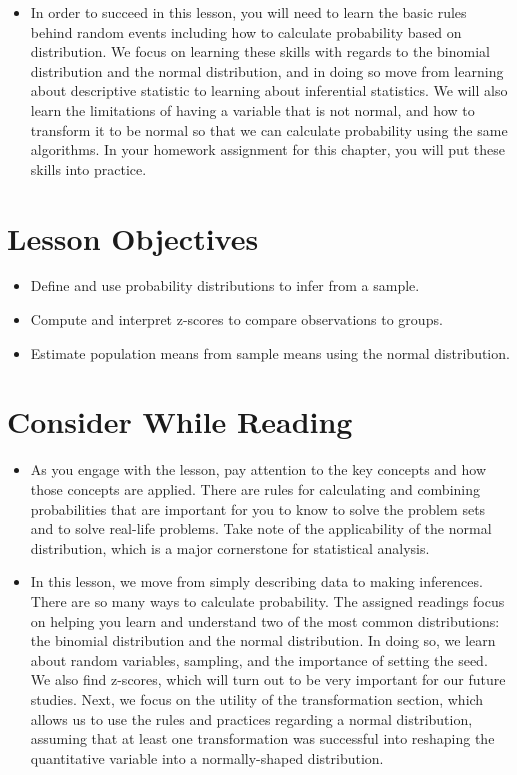 \documentclass[
  letterpaper,
  DIV=11,
  numbers=noendperiod]{scrreprt}
\providecommand{\tightlist}{%
  \setlength{\itemsep}{0pt}\setlength{\parskip}{0pt}}\usepackage{longtable,booktabs,array}
\begin{document}
\begin{itemize}
\tightlist
\item
  In order to succeed in this lesson, you will need to learn the basic
  rules behind random events including how to calculate probability
  based on distribution. We focus on learning these skills with regards
  to the binomial distribution and the normal distribution, and in doing
  so move from learning about descriptive statistic to learning about
  inferential statistics. We will also learn the limitations of having a
  variable that is not normal, and how to transform it to be normal so
  that we can calculate probability using the same algorithms. In your
  homework assignment for this chapter, you will put these skills into
  practice.
\end{itemize}

\section{Lesson Objectives}\label{lesson-objectives-4}

\begin{itemize}
\tightlist
\item
  Define and use probability distributions to infer from a sample.
\item
  Compute and interpret z-scores to compare observations to groups.
\item
  Estimate population means from sample means using the normal
  distribution.
\end{itemize}

\section{Consider While Reading}\label{consider-while-reading-4}

\begin{itemize}
\tightlist
\item
  As you engage with the lesson, pay attention to the key concepts and
  how those concepts are applied. There are rules for calculating and
  combining probabilities that are important for you to know to solve
  the problem sets and to solve real-life problems. Take note of the
  applicability of the normal distribution, which is a major cornerstone
  for statistical analysis.
\item
  In this lesson, we move from simply describing data to making
  inferences. There are so many ways to calculate probability. The
  assigned readings focus on helping you learn and understand two of the
  most common distributions: the binomial distribution and the normal
  distribution. In doing so, we learn about random variables, sampling,
  and the importance of setting the seed. We also find z-scores, which
  will turn out to be very important for our future studies. Next, we
  focus on the utility of the transformation section, which allows us to
  use the rules and practices regarding a normal distribution, assuming
  that at least one transformation was successful into reshaping the
  quantitative variable into a normally-shaped distribution.
\end{itemize}
\end{document}
